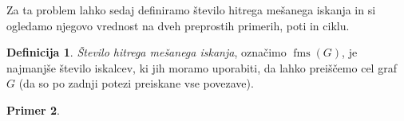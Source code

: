 \documentclass[12pt,a4paper,twoside]{article}
\theoremstyle{definition} %
\newtheorem{definicija}{Definicija}[section]
\newtheorem{primer}[definicija]{Primer}
\theoremstyle{plain} %
\numberwithin{equation}{section}  %
\DeclareMathOperator{\fms}{fms}
\begin{document}
Za ta problem lahko sedaj definiramo število hitrega mešanega iskanja in si ogledamo njegovo vrednost na dveh preprostih primerih, poti in ciklu.
\begin{definicija}
    \emph{Število hitrega mešanega iskanja}, označimo $\fms{(G)}$, je najmanjše število iskalcev, ki jih moramo uporabiti, da lahko preiščemo cel graf $G$ (da so po zadnji potezi preiskane vse povezave).
\end{definicija}
\begin{primer}
    \label{prim:fms}
    \begin{figure}[h]
        \begin{subfigure}{0.5\textwidth}
            \centering
        \end{subfigure}
        \begin{subfigure}{0.49\textwidth}
            \centering
\end{subfigure}
\end{figure}
\end{primer}
\end{document}
